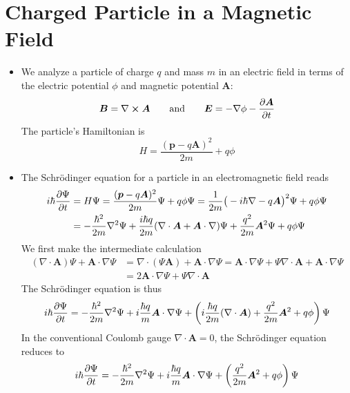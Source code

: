 \documentclass[11pt, a4paper]{article}
\renewcommand{\div}{\nabla \cdot}
\renewcommand{\curl}{\nabla \cross}
\renewcommand{\grad}{\nabla}
\renewcommand{\laplacian}{\nabla^{2}}
\newcommand{\eqtext}[1]{\qquad \text{#1} \qquad}
\newcommand{\Schro}{Schr\"{o}dinger\xspace}
\renewcommand{\vec}[1]{\bm{#1}}  %
\newcommand{\A}{\vec{A}}  %
\renewcommand{\P}{\Psi}  %
\begin{document}
\section{Charged Particle in a Magnetic Field}
\begin{itemize}
	\item We analyze a particle of charge $ q $ and mass $ m $ in an electric field in terms of the electric potential $ \phi $ and magnetic potential $ \A $:
	\begin{equation*}
		\vec{B} = \curl \A \eqtext{and} \vec{E} = - \grad \phi - \pdv{\A}{t}
	\end{equation*}
	The particle's Hamiltonian is
	\begin{equation*}
		H = \frac{(\vec{p} - q\A)^{2}}{2m} + q \phi
	\end{equation*}
	
	\item The \Schro equation for a particle in an electromagnetic field reads
	\begin{align*}
		i \hbar \pdv{\P}{t} &= H \P = \frac{(\vec{p} - q\A)^{2}}{2m}\P + q \phi\P = \frac{1}{2m}\big(-i\hbar \grad - q\A\big)^{2}\P + q\phi \P\\
		& = -\frac{\hbar^{2}}{2m}\laplacian \P + \frac{i \hbar q}{2m}(\div \A + \A \cdot \grad)\P + \frac{q^{2}}{2m}\A^{2}\P + q \phi \P
	\end{align*}
	We first make the intermediate calculation
	\begin{align*}
		(\div \A) \P + \A \cdot \grad \P & = \div (\P \A) + \A \cdot \grad \P = \A \cdot \grad \P + \P \div \A + \A \cdot \grad \P \\
		& = 2\A \cdot \grad \P + \P \div \A 
	\end{align*}
	The \Schro equation is thus
	\begin{equation*}
		i \hbar \pdv{\P}{t} = -\frac{\hbar^{2}}{2m}\laplacian \P + i \frac{\hbar q}{m}\A \cdot \grad \P + \left(i\frac{\hbar q}{2m}(\div \A) + \frac{q^{2}}{2m}\A^{2} + q\phi\right)\P
	\end{equation*}
	In the conventional Coulomb gauge $ \div \A = 0 $, the \Schro equation reduces to
	\begin{equation*}
		i \hbar \pdv{\P}{t} = -\frac{\hbar^{2}}{2m}\laplacian \P + i \frac{\hbar q}{m}\A \cdot \grad \P + \left(\frac{q^{2}}{2m}\A^{2} + q\phi\right)\P
	\end{equation*}
\end{itemize}
\end{document}
